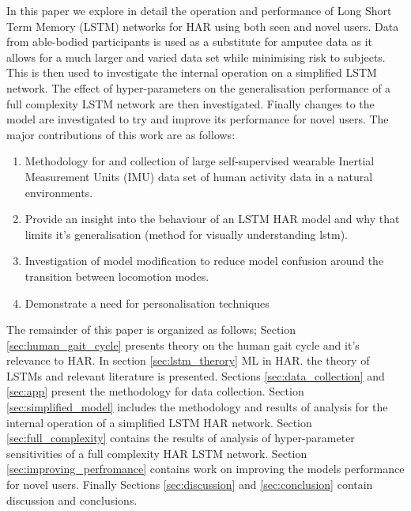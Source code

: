 \documentclass[sensors,article,submit,moreauthors,pdftex]{Definitions/mdpi}
\begin{document}
In this paper we explore in detail the operation and performance of Long Short Term Memory (LSTM) networks for HAR using both seen and novel users. Data from able-bodied participants is used as a substitute for amputee data as it allows for a much larger and varied data set while minimising risk to subjects. This is then used to investigate the internal operation on a simplified LSTM network. The effect of hyper-parameters on the generalisation performance of a full complexity LSTM network are then investigated. Finally changes to the model are investigated to try and improve its performance for novel users. The major contributions of this work are as follows:
\begin{enumerate}
\item Methodology for and collection of large self-supervised wearable Inertial Measurement Units (IMU) data set of human activity data in a natural environments.
\item Provide an insight into the behaviour of an LSTM HAR model and why that limits it's generalisation (method for visually understanding lstm).
\item Investigation of model modification to reduce model confusion around the transition between locomotion modes.
\item Demonstrate a need for personalisation techniques
\end{enumerate}

The remainder of this paper is organized as follows; Section \ref{sec:human_gait_cycle} presents theory on the human gait cycle and it's relevance to HAR. In section \ref{sec:lstm_therory} ML in HAR. the theory of LSTMs and relevant literature is presented. Sections \ref{sec:data_collection} and \ref{sec:app} present the methodology for data collection. Section \ref{sec:simplified_model} includes the methodology and results of analysis for the internal operation of a simplified LSTM HAR network. Section \ref{sec:full_complexity} contains the results of analysis of hyper-parameter sensitivities of a full complexity HAR LSTM network. Section \ref{sec:improving_perfromance} contains work on improving the models performance for novel users. Finally Sections \ref{sec:discussion} and \ref{sec:conclusion} contain discussion and conclusions.




\end{document}
